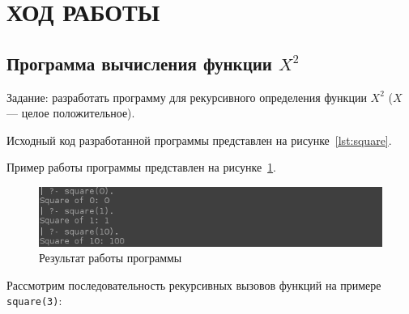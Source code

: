 \section{ХОД РАБОТЫ}

\subsection{Программа вычисления функции \( X^2 \)}

Задание: разработать программу для рекурсивного
определения функции \( X^2 \) (\( X \) --- целое положительное).

Исходный код разработанной программы представлен на
рисунке~\ref{lst:square}.



Пример работы программы представлен на рисунке~\ref{fig:square}.

\begin{figure}[h!]
  \centering
  \includegraphics[width=150mm]{img/square}
  \caption{Результат работы программы}
  \label{fig:square}
\end{figure}


Рассмотрим последовательность рекурсивных вызовов функций на примере \texttt{square(3)}:

